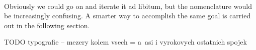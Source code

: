 \documentclass[12pt,a4paper]{article}
\newtheorem{theorem}{Theorem}[section]
\newenvironment{proof}
{\noindent \textit{Proof.}}
{\hspace*{\fill} $\Box$}
\newcommand{\set}[2]{\ensuremath{\{#1 \,|\, #2 \}}}
\newcommand{\el}{\prec}
\newcommand{\sub}{\subseteq}
\newcommand{\then}{\rightarrow}
\newcommand{\bce}{\begin{compactenum}}
\newcommand{\ece}{\end{compactenum}}
\begin{document}
\

Obviously we could go on and iterate it ad libitum, but the nomenclature would be increasingly confusing. A smarter way to accomplish the same goal is carried out in the following section.

TODO typografie -- mezery kolem vsech = a~asi i vyrokovych ostatnich spojek


{\color{red}
\begin{comment}

\begin{theorem}\label{th:refl_inaccessible}[Lévy] The following are equivalent:
\bce[(i)]
\item $\kappa$ is inaccessible.
\item For every $R \sub V_\kappa$ and every first-order formula $\varphi(R)$, $\varphi(R)$ reflects in $V_\kappa$.
\item For every $R \sub V_\kappa$, the set $C = \set{\alpha<\kappa}{\langle V_\alpha,\in,R \cap V_\alpha\rangle \el \langle V_\kappa,\in,R \rangle}$ is closed unbounded.
\ece
\end{theorem}
\begin{proof}
Let's start with (i) $\then$ (iii) in a~way similar to \cite{KanamoriBook}.\newline
The set $\set{\alpha<\kappa}{\langle V_\alpha,\in,R \cap V_\alpha \rangle \el \langle V_\kappa,\in,R\rangle}$ is clearly closed, it remains to show that it is also unbounded.
To do so, let $\alpha<\kappa$ be arbitrary. Define $\alpha_n < \kappa$ for $n\in\omega$ by recursion as follows:\newline
Set $\alpha_0=\alpha$. Given $\alpha_n < \kappa$ define $\alpha_{n+1}$ to be the least $\beta \geq \alpha_n$ such as 
whenever $y_1,\ldots,y_k \in V_{\alpha_n}$ and
$\langle V_{\kappa}, \in, R \rangle \models \exists v_0 \varphi [v_0, y_1, \ldots, y_k ]$
for some formula $\varphi$, there is an $x \in V_{\beta}$ such that $\langle V_{\kappa}, \in, R\rangle \models \varphi [x, y_1, \ldots, y_k]$.
\newline
Since $\kappa$ is inaccessible, $|V_{\alpha_n}| < \kappa$ and so $\alpha_{n+1} < \kappa$.\newline
Finally, set $\alpha = sup({\alpha_n | n \in \omega})$. 
Then $\langle$
 $V_ \alpha, \in, R  \cap V_\alpha \rangle \prec \langle V_{\kappa}, \in, R\rangle$ by the usual (Tarski) criterion for elementary substructure.
 \newline\newline

\end{comment}}
\end{document}
